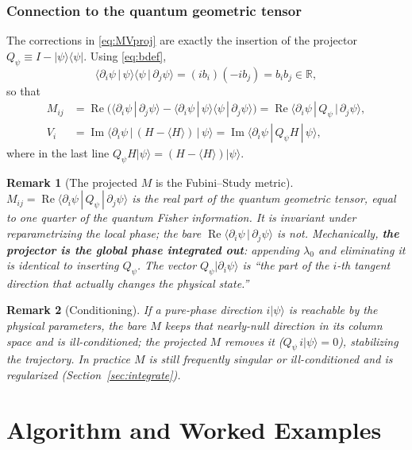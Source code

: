 \documentclass[12pt,a4paper]{article}
\newcommand{\ket}[1]{\lvert #1 \rangle}
\newcommand{\bra}[1]{\langle #1 \rvert}
\newcommand{\braket}[2]{\langle #1 \,|\, #2 \rangle}
\newcommand{\mel}[3]{\langle #1 \,|\, #2 \,|\, #3 \rangle}
\newcommand{\re}{\operatorname{Re}}
\newcommand{\im}{\operatorname{Im}}
\newtheorem{remark}{Remark}[section]
\begin{document}
\section{Connection to the quantum geometric tensor}\label{sec:qgt}

The corrections in \eqref{eq:MVproj} are exactly the insertion of the projector
$Q_\psi\equiv I-\ket{\psi}\bra{\psi}$. Using \eqref{eq:bdef},
\begin{equation}
  \braket{\partial_i\psi}{\psi}\braket{\psi}{\partial_j\psi}=(ib_i)(-ib_j)=b_ib_j\in\mathbb{R},
\end{equation}
so that
\begin{align}
  M_{ij}&=\re\!\big(\braket{\partial_i\psi}{\partial_j\psi}-\braket{\partial_i\psi}{\psi}\braket{\psi}{\partial_j\psi}\big)
        =\re\mel{\partial_i\psi}{Q_\psi}{\partial_j\psi},\\
  V_i&=\im\mel{\partial_i\psi}{(H-\langle H\rangle)}{\psi}
      =\im\mel{\partial_i\psi}{Q_\psi H}{\psi},
  \label{eq:Qform}
\end{align}
where in the last line $Q_\psi H\ket{\psi}=(H-\langle H\rangle)\ket{\psi}$.

\begin{remark}[The projected $M$ is the Fubini--Study metric]
$M_{ij}=\re\mel{\partial_i\psi}{Q_\psi}{\partial_j\psi}$ is the real part of the quantum geometric
tensor, equal to one quarter of the quantum Fisher information. It is invariant under reparametrizing
the local phase; the bare $\re\braket{\partial_i\psi}{\partial_j\psi}$ is not. Mechanically,
\textbf{the projector is the global phase integrated out}: appending $\lambda_0$ and eliminating it
is identical to inserting $Q_\psi$. The vector $Q_\psi\ket{\partial_i\psi}$ is ``the part of the
$i$-th tangent direction that actually changes the physical state.''
\end{remark}

\begin{remark}[Conditioning]
If a pure-phase direction $i\ket{\psi}$ is reachable by the physical parameters, the bare $M$ keeps
that nearly-null direction in its column space and is ill-conditioned; the projected $M$ removes it
($Q_\psi\, i\ket{\psi}=0$), stabilizing the trajectory. In practice $M$ is still frequently
singular or ill-conditioned and is regularized (Section~\ref{sec:integrate}).
\end{remark}

\newpage
\part{Algorithm and Worked Examples}
\end{document}
